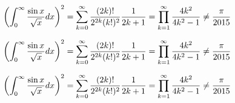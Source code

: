 \clearpage
\begin{minipage}[htpb]{120mm}
		\vspace*{10mm}
			{\normalsize 
				\[ \sampleEq \]\par}

			{\Large 
				\[ \sampleEq \]\par}

			{\footnotesize
				\[ \sampleEq \]\par}
\end{minipage}